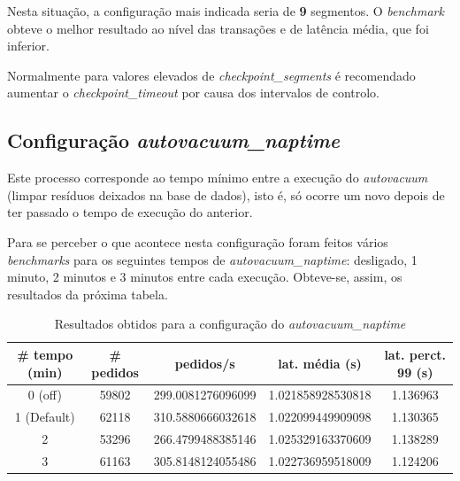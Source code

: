 Nesta situação, a configuração mais indicada seria de \textbf{9} segmentos. O \textit{benchmark} obteve o melhor resultado ao nível das transações e de latência média, que foi inferior.

Normalmente para valores elevados de \textit{checkpoint\_segments} é recomendado aumentar o \textit{checkpoint\_timeout} por causa dos intervalos de controlo.

\newpage

\subsection{Configuração \textit{autovacuum\_naptime}}

Este processo corresponde ao tempo mínimo entre a execução do \textit{autovacuum} (limpar resíduos deixados na base de dados), isto é, só ocorre um novo depois de ter passado o tempo de execução do anterior.

Para se perceber o que acontece nesta configuração foram feitos vários \textit{benchmarks} para os seguintes tempos de \textit{autovacuum\_naptime}: desligado, 1 minuto, 2 minutos e 3 minutos entre cada execução. Obteve-se, assim, os resultados da próxima tabela.

\begin{table}[!h]
\center
\small
\begin{tabular}{|c|c|c|c|c|}
\hline
\textbf{\# tempo (min)} & \textbf{\# pedidos} & \textbf{pedidos/s} & \textbf{lat. média (s)} & \textbf{lat. perct. 99 (s)}  \\ \hline
0 (off) & 59802 & 299.0081276096099 & 1.021858928530818 & 1.136963  \\ \hline
1 (Default) & 62118 & 310.5880666032618 & 1.022099449909098 & 1.130365  \\ \hline
2 & 53296 & 266.4799488385146 & 1.025329163370609 & 1.138289  \\ \hline
3 & 61163 & 305.8148124055486 & 1.022736959518009 & 1.124206  \\ \hline
\end{tabular}
\caption{Resultados obtidos para a configuração do \textit{autovacuum\_naptime}}
\end{table}

